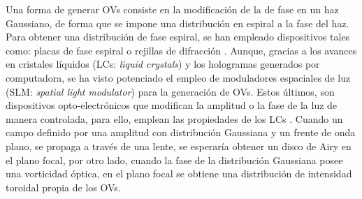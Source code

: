 Una forma de generar OVs consiste en la modificación de la de fase en un haz Gaussiano, de forma que se impone una distribución en espiral a la fase del haz\cite{Rozas1999, Bazhenov1990}. Para obtener una distribución de fase espiral, se han empleado dispositivos tales como: placas de fase espiral \cite{Ruffato2014, Schemmel2014} o rejillas de difracción \cite{Bekshaev2010, Heckenberg1992, Bekshaev2010a}. Aunque, gracias a los avances en cristales líquidos (LCs: \textit{liquid crystals}) y los hologramas generados por computadora, se ha visto potenciado el empleo de moduladores espaciales de luz (SLM: \textit{spatial light modulator}) para la generación de OVs. Estos últimos, son dispositivos opto-electrónicos que modifican la amplitud o la fase de la luz de manera controlada, para ello, emplean las propiedades de los LCs \cite{Uribe2011, Burman2010, Gennes2007}. Cuando un campo definido por una amplitud con distribución Gaussiana y un frente de onda plano, se propaga a través de una lente, se esperaría obtener un disco de Airy en el plano focal, por otro lado, cuando la fase de la distribución Gaussiana posee una vorticidad óptica, en el plano focal se obtiene una distribución de intensidad toroidal propia de los OVs.\\





